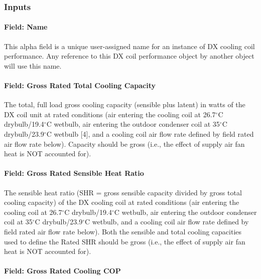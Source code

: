 \subsubsection{Inputs}\label{inputs-18-001}

\paragraph{Field: Name}\label{field-name-17-001}

This alpha field is a unique user-assigned name for an instance of DX cooling coil performance. Any reference to this DX coil performance object by another object will use this name.

\paragraph{Field: Gross Rated Total Cooling Capacity}\label{field-gross-rated-total-cooling-capacity-2}

The total, full load gross cooling capacity (sensible plus latent) in watts of the DX coil unit at rated conditions (air entering the cooling coil at 26.7$^\circ$C drybulb/19.4$^\circ$C wetbulb, air entering the outdoor condenser coil at 35$^\circ$C drybulb/23.9$^\circ$C wetbulb {[}4{]}, and a cooling coil air flow rate defined by field rated air flow rate below). Capacity should be gross (i.e., the effect of supply air fan heat is NOT accounted for).

\paragraph{Field: Gross Rated Sensible Heat Ratio}\label{field-gross-rated-sensible-heat-ratio-1}

The sensible heat ratio (SHR = gross sensible capacity divided by gross total cooling capacity) of the DX cooling coil at rated conditions (air entering the cooling coil at 26.7$^\circ$C drybulb/19.4$^\circ$C wetbulb, air entering the outdoor condenser coil at 35$^\circ$C drybulb/23.9$^\circ$C wetbulb, and a cooling coil air flow rate defined by field rated air flow rate below). Both the sensible and total cooling capacities used to define the Rated SHR should be gross (i.e., the effect of supply air fan heat is NOT accounted for).

\paragraph{Field: Gross Rated Cooling COP}\label{field-gross-rated-cooling-cop-1}

